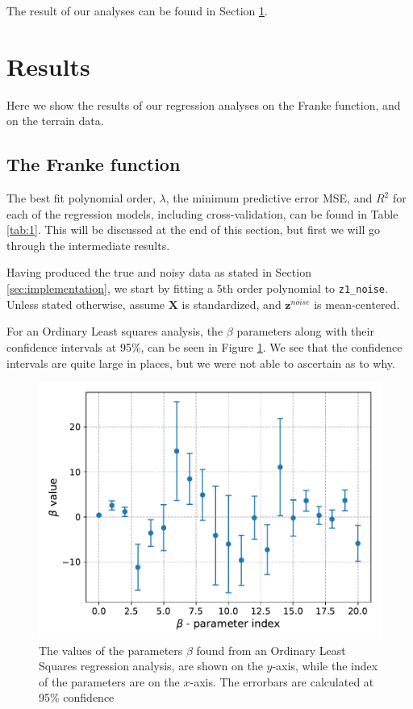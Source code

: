 \documentclass[a4paper,10pt,english]{article}
\def\code#1{\texttt{#1}} %
\begin{document}
The result of our analyses can be found in Section \ref{sec:results}.
%
%
\section{Results}\label{sec:results}
Here we show the results of our regression analyses on the Franke function, and on the terrain data.

\subsection{The Franke function}
The best fit polynomial order, $\lambda$, the minimum predictive error MSE, and $R^2$ for each of the regression models, including cross-validation, can be found in Table \ref{tab:1}. This will be discussed at the end of this section, but first we will go through the intermediate results.

Having produced the true and noisy data as stated in Section \ref{sec:implementation}, we start by fitting a 5th order polynomial to \code{z1\_noise}. Unless stated otherwise, assume $\bm{X}$ is standardized, and $\bm{z}^{noise}$ is mean-centered.

For an Ordinary Least squares analysis, the $\beta$ parameters along with their confidence intervals at 95\%, can be seen in Figure \ref{fig:1}. We see that the confidence intervals are quite large in places, but we were not able to ascertain as to why.

\begin{figure}[H]
	\centering
	\includegraphics[scale=0.6]{a_CI_betaOLS_st_wb0.pdf}
\caption{The values of the parameters $\beta$ found from an Ordinary Least Squares regression analysis, are shown on the $y$-axis, while the index of the parameters are on the $x$-axis. The errorbars are calculated at 95\% confidence}
	\label{fig:1}
\end{figure}
\end{document}
